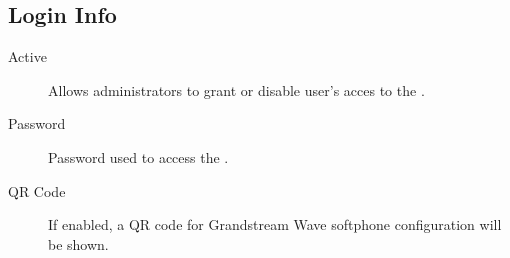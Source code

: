 \documentclass[letterpaper,10pt,english]{sphinxmanual}
\begin{document}
\subsection{Login Info}
\label{company/users:login-info}
\noindent{}
\begin{description}
\item[{Active}] \leavevmode{}\label{company/users:term-active}
Allows administrators to grant or disable user's acces to the
{\hyperref[userportal/index:userportal]{}}.

\item[{Password}] \leavevmode{}\label{company/users:term-password}
Password used to access the {\hyperref[userportal/index:userportal]{}}.

\item[{QR Code}] \leavevmode{}\label{company/users:term-qr-code}
If enabled, a QR code for Grandstream Wave softphone configuration
will be shown.

\end{description}
\end{document}
